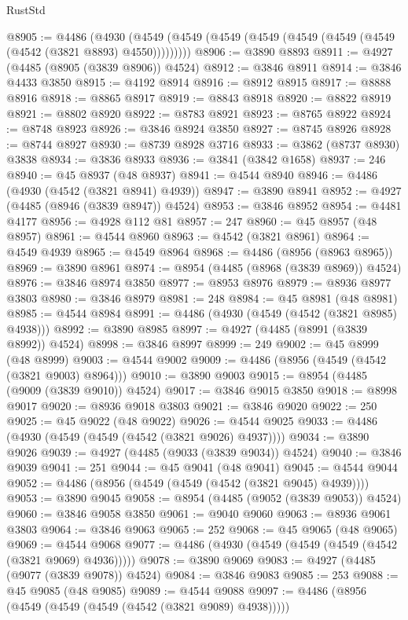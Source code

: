 \begin{lexlean}{RustStd}
\begin{coremodule}
@8905 := @4486
    (@4930 (@4549 (@4549 (@4549 (@4549 (@4549 (@4549 (@4549 (@4542 (@3821 @8893) @4550)))))))))
@8906 := @3890 @8893
@8911 := @4927 (@4485 (@8905 (@3839 @8906)) @4524)
@8912 := @3846 @8911
@8914 := @3846 @4433 @3850
@8915 := @4192 @8914
@8916 := @8912 @8915
@8917 := @8888 @8916
@8918 := @8865 @8917
@8919 := @8843 @8918
@8920 := @8822 @8919
@8921 := @8802 @8920
@8922 := @8783 @8921
@8923 := @8765 @8922
@8924 := @8748 @8923
@8926 := @3846 @8924 @3850
@8927 := @8745 @8926
@8928 := @8744 @8927
@8930 := @8739 @8928 @3716
@8933 := @3862 (@8737 @8930) @3838
@8934 := @3836 @8933
@8936 := @3841 (@3842 @1658)
@8937 := 246
@8940 := @45 @8937 (@48 @8937)
@8941 := @4544 @8940
@8946 := @4486 (@4930 (@4542 (@3821 @8941) @4939))
@8947 := @3890 @8941
@8952 := @4927 (@4485 (@8946 (@3839 @8947)) @4524)
@8953 := @3846 @8952
@8954 := @4481 @4177
@8956 := @4928 @112 @81
@8957 := 247
@8960 := @45 @8957 (@48 @8957)
@8961 := @4544 @8960
@8963 := @4542 (@3821 @8961)
@8964 := @4549 @4939
@8965 := @4549 @8964
@8968 := @4486 (@8956 (@8963 @8965))
@8969 := @3890 @8961
@8974 := @8954 (@4485 (@8968 (@3839 @8969)) @4524)
@8976 := @3846 @8974 @3850
@8977 := @8953 @8976
@8979 := @8936 @8977 @3803
@8980 := @3846 @8979
@8981 := 248
@8984 := @45 @8981 (@48 @8981)
@8985 := @4544 @8984
@8991 := @4486 (@4930 (@4549 (@4542 (@3821 @8985) @4938)))
@8992 := @3890 @8985
@8997 := @4927 (@4485 (@8991 (@3839 @8992)) @4524)
@8998 := @3846 @8997
@8999 := 249
@9002 := @45 @8999 (@48 @8999)
@9003 := @4544 @9002
@9009 := @4486 (@8956 (@4549 (@4542 (@3821 @9003) @8964)))
@9010 := @3890 @9003
@9015 := @8954 (@4485 (@9009 (@3839 @9010)) @4524)
@9017 := @3846 @9015 @3850
@9018 := @8998 @9017
@9020 := @8936 @9018 @3803
@9021 := @3846 @9020
@9022 := 250
@9025 := @45 @9022 (@48 @9022)
@9026 := @4544 @9025
@9033 := @4486 (@4930 (@4549 (@4549 (@4542 (@3821 @9026) @4937))))
@9034 := @3890 @9026
@9039 := @4927 (@4485 (@9033 (@3839 @9034)) @4524)
@9040 := @3846 @9039
@9041 := 251
@9044 := @45 @9041 (@48 @9041)
@9045 := @4544 @9044
@9052 := @4486 (@8956 (@4549 (@4549 (@4542 (@3821 @9045) @4939))))
@9053 := @3890 @9045
@9058 := @8954 (@4485 (@9052 (@3839 @9053)) @4524)
@9060 := @3846 @9058 @3850
@9061 := @9040 @9060
@9063 := @8936 @9061 @3803
@9064 := @3846 @9063
@9065 := 252
@9068 := @45 @9065 (@48 @9065)
@9069 := @4544 @9068
@9077 := @4486 (@4930 (@4549 (@4549 (@4549 (@4542 (@3821 @9069) @4936)))))
@9078 := @3890 @9069
@9083 := @4927 (@4485 (@9077 (@3839 @9078)) @4524)
@9084 := @3846 @9083
@9085 := 253
@9088 := @45 @9085 (@48 @9085)
@9089 := @4544 @9088
@9097 := @4486 (@8956 (@4549 (@4549 (@4549 (@4542 (@3821 @9089) @4938)))))

\end{coremodule}
\end{lexlean}
